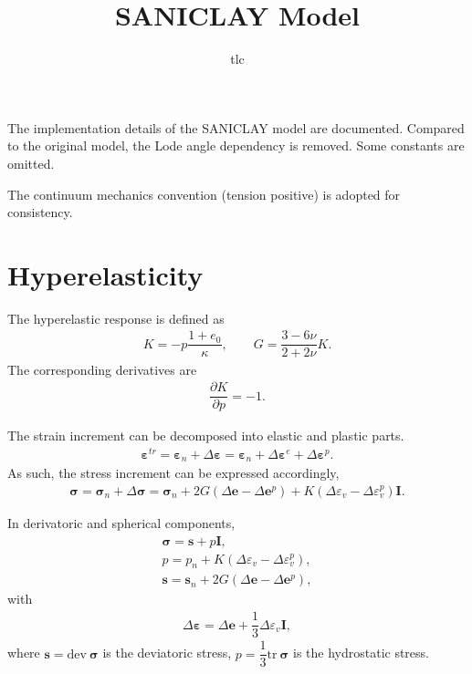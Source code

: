 \documentclass[11pt,a4paper]{article}
\title{SANICLAY Model}
\author{tlc}
\newcommand*{\tr}[1]{\mathrm{tr}~#1}
\newcommand*{\dev}[1]{\mathrm{dev}~#1}
\newcommand*{\pfrac}[2]{\dfrac{\partial#1}{\partial#2}}
\begin{document}
\maketitle
The implementation details of the SANICLAY model are documented. Compared to the original model, the Lode angle dependency is removed. Some constants are omitted.

The continuum mechanics convention (tension positive) is adopted for consistency.
\section{Hyperelasticity}
The hyperelastic response is defined as
\begin{gather}
K=-p\dfrac{1+e_0}{\kappa},\qquad
G=\dfrac{3-6\nu}{2+2\nu}K.
\end{gather}
The corresponding derivatives are
\begin{gather}
\pfrac{K}{p}=-1.
\end{gather}

The strain increment can be decomposed into elastic and plastic parts.
\begin{gather}
\mathbold{\varepsilon}^{tr}=\mathbold{\varepsilon}_n+\Delta\mathbold{\varepsilon}=\mathbold{\varepsilon}_n+\Delta\mathbold{\varepsilon}^{e}+\Delta\mathbold{\varepsilon}^{p}.
\end{gather}
As such, the stress increment can be expressed accordingly,
\begin{gather}
\mathbold{\sigma}=\mathbold{\sigma}_n+\Delta\mathbold{\sigma}=\mathbold{\sigma}_n+2G\left(\Delta{}\mathbold{e}-\Delta{}\mathbold{e}^{p}\right)+K\left(\Delta\varepsilon_v-\Delta\varepsilon_v^p\right)\mathbold{I}.
\end{gather}

In derivatoric and spherical components,
\begin{gather}
\mathbold{\sigma}=\mathbold{s}+p\mathbold{I},\\
p=p_n+K\left(\Delta\varepsilon_v-\Delta\varepsilon_v^p\right),\\
\mathbold{s}=\mathbold{s}_n+2G\left(\Delta{}\mathbold{e}-\Delta{}\mathbold{e}^{p}\right),
\end{gather}
with
\begin{gather}
\Delta\mathbold{\varepsilon}=\Delta{}\mathbold{e}+\dfrac{1}{3}\Delta\varepsilon_v\mathbold{I},
\end{gather}
where $\mathbold{s}=\dev{\mathbold{\sigma}}$ is the deviatoric stress, $p=\dfrac{1}{3}\tr{\mathbold{\sigma}}$ is the hydrostatic stress.
\end{document}
